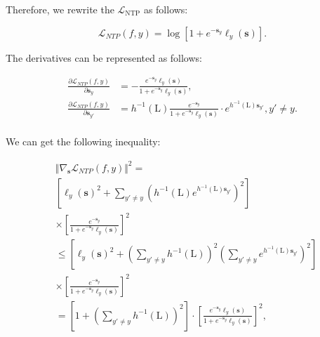 Therefore, we rewrite the $\mathcal{L}_\text{NTP}$ as follows:

\[
\mathcal{L}_{NTP}(f, y) = \log \left[ 1 + e^{- \boldsymbol{s}_y} \ell_y(\boldsymbol{s}) \right].
\]

The derivatives can be represented as follows:

\begin{small}
\begin{equation}
    \begin{aligned}
    \frac{\partial \mathcal{L}_{NTP}(f, y)}{\partial \boldsymbol{s}_y} & = - \frac{e^{- \boldsymbol{s}_y} \ell_y(\boldsymbol{s})}{1 + e^{- \boldsymbol{s}_y} \ell_y(\boldsymbol{s})}, \\
    \frac{\partial \mathcal{L}_{NTP}(f, y)}{\partial \boldsymbol{s}_{y'}} & = h^{-1}(\text{L}) \frac{e^{- \boldsymbol{s}_y}}{1 + e^{- \boldsymbol{s}_y} \ell_y(\boldsymbol{s})} \cdot e^{h^{-1}(\text{L}) \boldsymbol{s}_{y'}}, y' \neq y. \\
\end{aligned}
\end{equation}
\end{small}

We can get the following inequality:

\begin{small}
    \begin{equation}
        \begin{aligned}
    & \Vert \nabla_{\boldsymbol{s}} \mathcal{L}_{NTP}(f, y) \Vert^2 = \\
    &\left[ \ell_y(\boldsymbol{s})^2 + \sum_{y' \neq y} \left(h^{-1}(\text{L}) e^{h^{-1}(\text{L}) \boldsymbol{s}_{y'}} \right)^2 \right]  \\
    & \times \left[\frac{e^{- \boldsymbol{s}_y}}{1 + e^{- \boldsymbol{s}_y} \ell_y(\boldsymbol{s})} \right]^2 \\
    & \le \left[ \ell_y(\boldsymbol{s})^2 \! + \! \left( \sum_{y' \neq y} h^{-1}(\text{L}) \! \right)^2 \! \left( \sum_{y' \neq y} e^{h^{-1}(\text{L}) \boldsymbol{s}_{y'}} \! \right)^2 \right] \\
    & \times \left[ \frac{e^{- \boldsymbol{s}_y}}{1 + e^{- \boldsymbol{s}_y} \ell_y(\boldsymbol{s})} \right]^2 \\
    & = \left[ 1 + \left( \sum_{y' \neq y} h^{-1}(\text{L}) \right)^2 \right] \cdot \left[ \frac{e^{- \boldsymbol{s}_y} \ell_y(\boldsymbol{s}) }{1 + e^{- \boldsymbol{s}_y} \ell_y(\boldsymbol{s})} \right]^2,
\end{aligned}
    \end{equation}
\end{small}

